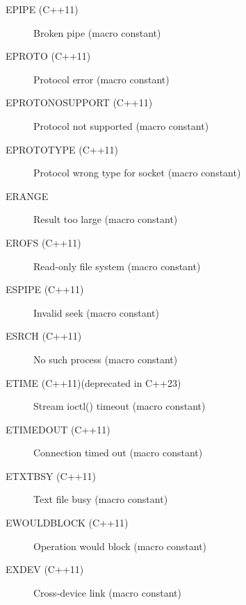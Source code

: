 \documentclass{report}
\begin{document}
\begin{itemize}
\begin{description}
      \item[EPIPE (C++11)] Broken pipe (macro constant)
      \item[EPROTO (C++11)] Protocol error (macro constant)
      \item[EPROTONOSUPPORT (C++11)] Protocol not supported (macro constant)
      \item[EPROTOTYPE (C++11)] Protocol wrong type for socket (macro constant)
      \item[ERANGE] Result too large (macro constant)
      \item[EROFS (C++11)] Read-only file system (macro constant)
      \item[ESPIPE (C++11)] Invalid seek (macro constant)
      \item[ESRCH (C++11)] No such process (macro constant)
      \item[ETIME (C++11)(deprecated in C++23)] Stream ioctl() timeout (macro constant)
      \item[ETIMEDOUT (C++11)] Connection timed out (macro constant)
      \item[ETXTBSY (C++11)] Text file busy (macro constant)
      \item[EWOULDBLOCK (C++11)] Operation would block (macro constant)
      \item[EXDEV (C++11)] Cross-device link (macro constant)
    \end{description}

    \end{itemize}

    \bigbreak \noindent 
\end{document}

